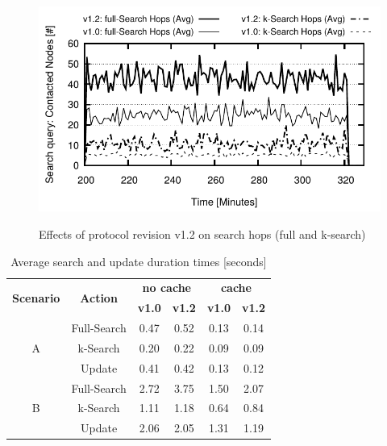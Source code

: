 \begin{figure}[t!]
  \centering
  \includegraphics[width=0.98\linewidth]{graphics/fig/Search_Hops}
  \\[-1ex]
  \caption{Effects of protocol revision v1.2 on search hops (full and k-search)}
  \label{fig:search_hops}
\end{figure}


\begin{table}[hb]
\centering
\caption{Average search and update duration times [seconds]}
\label{tab:durations}
\begin{tabular}{|c|c|c|c|c|c|}
\hline
\multirow{2}{*}{\textbf{Scenario}} & \multirow{2}{*}{\textbf{Action}} & \multicolumn{2}{c|}{\textbf{no cache}} & \multicolumn{2}{c|}{\textbf{cache}} \\ \cline{3-6} 
                                   &                                  & \textbf{v1.0}      & \textbf{v1.2}     & \textbf{v1.0}    & \textbf{v1.2}    \\ \hline
                                                                                                                                                        \hline
\multirow{3}{*}{A}                 & Full-Search                      & 0.47               & 0.52              & 0.13             & 0.14             \\ \cline{2-6} 
                                   & k-Search                         & 0.20               & 0.22              & 0.09             & 0.09             \\ \cline{2-6} 
                                   & Update                           & 0.41               & 0.42              & 0.13             & 0.12             \\ \hline
\multirow{3}{*}{B}                 & Full-Search                      & 2.72               & 3.75              & 1.50             & 2.07             \\ \cline{2-6} 
                                   & k-Search                         & 1.11               & 1.18              & 0.64             & 0.84             \\ \cline{2-6} 
                                   & Update                           & 2.06               & 2.05              & 1.31             & 1.19             \\ \hline
\end{tabular}
\end{table}




